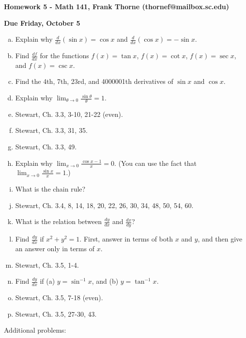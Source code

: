 \documentclass[12pt]{article}
\begin{document}
\setlength{\topmargin}{-2mm}





\begin{center}{\bf Homework 5 - Math 141, Frank Thorne (thornef@mailbox.sc.edu)}
\end{center}
\begin{center}
{\bf Due Friday, October 5}
\end{center}

\begin{enumerate}[(a)]


\item
Explain why $\frac{d}{dx}(\sin x) = \cos x$ and $\frac{d}{dx}(\cos x) = - \sin x$.

\item
Find $\frac{df}{dx}$ for the functions $f(x) = \tan x$, $f(x) = \cot x$, $f(x) = \sec x$, and
$f(x) = \csc x$.

\item
Find the 4th, 7th, 23rd, and 4000001th derivatives of $\sin x$ and $\cos x$.

\item
Explain why $\lim_{\theta \rightarrow 0} \frac{\sin \theta}{\theta} = 1$.

\item
Stewart, Ch. 3.3, 3-10, 21-22 (even).

\item
Stewart, Ch. 3.3, 31, 35.

\item
Stewart, Ch. 3.3, 49.
\item
Explain why $\lim_{x \rightarrow 0} \frac{\cos x - 1}{x} = 0$. (You can use the fact
that $\lim_{x \rightarrow 0} \frac{\sin x}{x} = 1$.)

\item
What is the chain rule?

\item
Stewart, Ch. 3.4, 8, 14, 18, 20, 22, 26, 30, 34, 48, 50, 54, 60.

\item
What is the relation between $\frac{dy}{dx}$ and $\frac{dx}{dy}$? 

\item
Find $\frac{dy}{dx}$ if $x^2 + y^2 = 1$. First, answer in terms of both $x$
and $y$, and then give an answer only in terms of $x$.

\item
Stewart, Ch. 3.5, 1-4.

\item
Find $\frac{dy}{dx}$ if (a) $y = \sin^{-1} x$, and (b) $y = \tan^{-1} x$.

\item
Stewart, Ch. 3.5, 7-18 (even).

\item
Stewart, Ch. 3.5, 27-30, 43.
\end{enumerate}
Additional problems:
\end{document}
